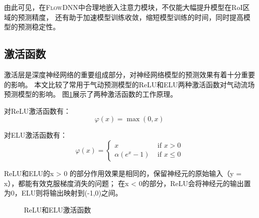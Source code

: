由此可见，在\textsc{FlowDNN}中合理地嵌入注意力模块，不仅能大幅提升模型在RoI区域的预测精度，
还有助于加速模型训练收敛，缩短模型训练的时间，同时提高模型的预测稳定性。


\subsection{激活函数}\label{ac_effect}
激活层是深度神经网络的重要组成部分，对神经网络模型的预测效果有着十分重要的影响。
本文比较了常用于气动预测模型的ReLU和ELU两种激活函数对气动流场预测模型的影响。
图\ref{fig:activation_intro}展示了两种激活函数的工作原理。

对ReLU激活函数有：
\begin{equation}
\varphi(x)=\max (0, x)
\end{equation}

\noindent 对ELU激活函数有：
\begin{equation}
\varphi(x)=\left\{\begin{array}{ll}
x & \text { if } x>0 \\
\alpha\left(e^{x}-1\right) & \text { if } x \leq 0
\end{array}\right.
\end{equation}

\noindent ReLU和ELU的x > 0 的部分作用效果是相同的，保留神经元的原始输入（y = x），都能有效克服梯度消失的问题\cite{2010Rectified}；
在x < 0的部分，ReLU会将神经元的输出置为0，ELU则将输出映射到(-1,0)之间。


\begin{figure}[htb]
	\centering
	 \qquad
	\caption{ReLU和ELU激活函数}
	\label{fig:activation_intro}
\end{figure}



